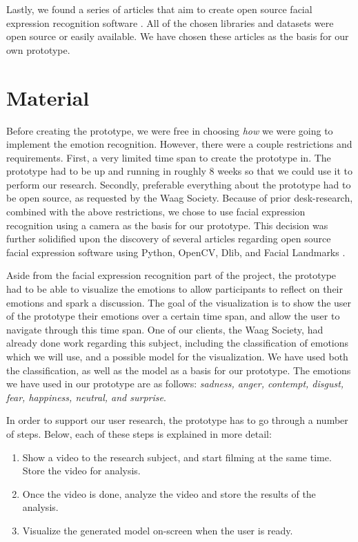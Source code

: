 \documentclass[sigconf]{acmart}
\begin{document}
Lastly, we found a series of articles that aim to create open source facial expression recognition software
\cite{gent2016landmarks}. All of the chosen libraries and datasets were open source or easily available.
We have chosen these articles as the basis for our own prototype.


\section{Material}
Before creating the prototype, we were free in choosing \emph{how} we were going to implement the emotion
recognition. However, there were a couple restrictions and requirements. First, a very limited time span
to create the prototype in. The prototype had to be up and running in roughly 8 weeks so that we could
use it to perform our research. Secondly, preferable everything about the prototype had to be open source, as
requested by the Waag Society. Because of prior desk-research, combined with the above restrictions, we
chose to use facial expression recognition using a camera as the basis for our prototype. This decision was
further solidified upon the discovery of several articles regarding open source facial expression software
using Python, OpenCV, Dlib, and Facial Landmarks \cite{gent2016landmarks}.

Aside from the facial expression recognition part of the project, the prototype had to be able to visualize the
emotions to allow participants to reflect on their emotions and spark a discussion. The goal of the
visualization is to show the user of the prototype their emotions over a certain time span, and allow the user
to navigate through this time span. One of our clients, the Waag Society, had already done work regarding
this subject, including the classification of emotions \cite{plutchik1980general} which we will use,
and a possible model for the visualization. We have used both the classification, as well as the model
as a basis for our prototype. The emotions we have used in our prototype are as follows: \emph{sadness,
anger, contempt, disgust, fear, happiness, neutral, and surprise}.

In order to support our user research, the prototype has to go through a number of steps. Below, each of these
steps is explained in more detail:
\begin{enumerate}
    \item{Show a video to the research subject, and start filming at the same time. Store the video for analysis.}
    \item{Once the video is done, analyze the video and store the results of the analysis.}
    \item{Visualize the generated model on-screen when the user is ready.}
\end{enumerate}
\end{document}
